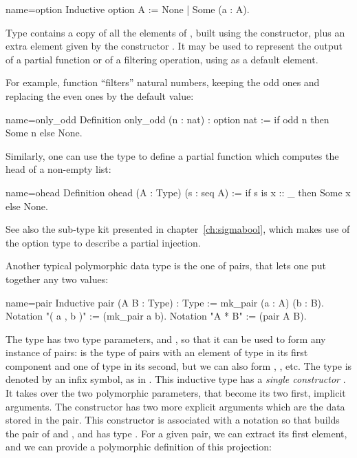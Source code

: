 \begin{coq}{name=option}{}
Inductive option A := None | Some (a : A).
\end{coq}

Type   contains a
copy of all the elements of ,
built using the  constructor, plus an extra element given by
the constructor . It may be used to represent the output of a
partial function or of a filtering operation, using  as a
default element.

For example, function  ``filters'' natural numbers, keeping the
odd ones and replacing the even ones by the  default value:

\begin{coq}{name=only_odd}{}
Definition only_odd (n : nat) : option nat :=
  if odd n then Some n else None.
\end{coq}

Similarly, one can use the  type to define a partial function
which computes the head of a non-empty list:


\begin{coq}{name=ohead}{}
Definition ohead (A : Type) (s : seq A) :=
  if s is x :: _ then Some x else None.
\end{coq}


See also the sub-type kit presented in chapter~\ref{ch:sigmabool},
which makes use of the option type to describe a partial injection.

Another typical polymorphic data type is the one of pairs, that
lets one put together any two values:
\index[coq]{\C{(_ , _)}}

\begin{coq}{name=pair}{}
Inductive pair (A B : Type) : Type := mk_pair (a : A) (b : B).
Notation "( a , b )" := (mk_pair a b).
Notation "A * B" := (pair A B).
\end{coq}

The type  has two type parameters,  and
, so
that it can be used to form any instance of pairs: 
is the type of pairs with an element of type  in its first
component and one of type  in its second, but we can also form
, , etc. The type  is
denoted by an infix \C{*} symbol, as in .
This inductive type has
a \emph{single constructor} . It takes over the two
polymorphic parameters, that become its two first, implicit arguments.
The constructor  has two more explicit arguments which are
the data stored in the pair. This constructor is associated with
a notation so that  builds the pair of  and , and
 has type . For a given pair, we can
extract its first element, and we can provide a polymorphic definition
of this projection:

